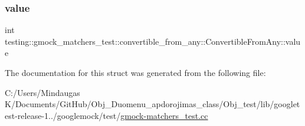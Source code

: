 \subsubsection{\texorpdfstring{value}{value}}
{\footnotesize\ttfamily int testing\+::gmock\+\_\+matchers\+\_\+test\+::convertible\+\_\+from\+\_\+any\+::\+Convertible\+From\+Any\+::value}



The documentation for this struct was generated from the following file\+:\begin{DoxyCompactItemize}
\item 
C\+:/\+Users/\+Mindaugas K/\+Documents/\+Git\+Hub/\+Obj\+\_\+\+Duomenu\+\_\+apdorojimas\+\_\+class/\+Obj\+\_\+test/lib/googletest-\/release-\/1../googlemock/test/\mbox{\hyperlink{_obj__test_2lib_2googletest-release-1_88_81_2googlemock_2test_2gmock-matchers__test_8cc}{gmock-\/matchers\+\_\+test.\+cc}}\end{DoxyCompactItemize}
